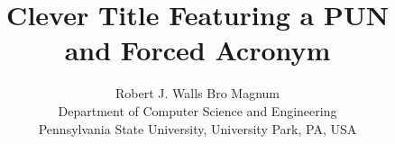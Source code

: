 \newcommand{\thetitle}{Clever Title Featuring a PUN \\ and Forced Acronym}
\newcommand{\pdftitle}{Clever Title Featuring a PUN and Forced Acronym}
\newcommand{\pdfauthors}{Robert J. Walls, Bro Magnum} 


\newcount\draft{} %

\newcommand{\sysname}{\textsc{System\-Name\-That\-Pun}\xspace}





\makeatletter
\def\@copyrightspace{\relax}
\makeatother

\title{\thetitle}
\author{Robert J. Walls \qquad Bro Magnum \\
Department of Computer Science and Engineering \\
Pennsylvania State University, University Park, PA, USA \\
\href{mailto:rjwalls@cse.psu.edu,bro@cse.psu.edu}
{}}
\maketitle







